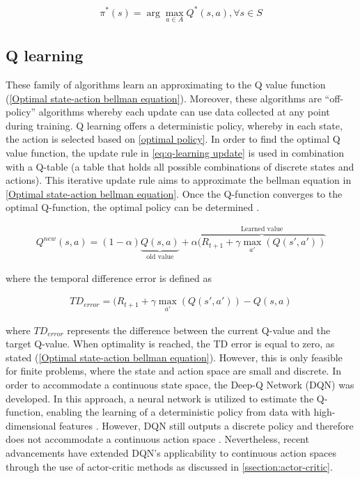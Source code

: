 \begin{equation}
	\begin{aligned}
		\pi^*(s) = \arg \max_{a \in A} Q^*(s, a), \forall s \in S
	\end{aligned}
	\label{optimal policy}
\end{equation}

\subsection{Q learning}
These family of algorithms learn an approximating to the Q value function (\autoref{Optimal state-action bellman equation}). Moreover, these algorithms are ``off-policy'' algorithms whereby each update can use data collected at any point during training. Q learning offers a deterministic policy, whereby in each state, the action is selected based on \autoref{optimal policy}. In order to find the optimal Q value function, the update rule in \autoref{eq:q-learning update} is used in combination with a Q-table (a table that holds all possible combinations of discrete states and actions). This iterative update rule aims to approximate the bellman equation in \autoref{Optimal state-action bellman equation}. Once the Q-function converges to the optimal Q-function, the optimal policy can be determined \cite{daveUnderstandingBellmanOptimality2021}.

\begin{equation}
	\begin{aligned}
		Q^{new}(s,a) = (1 -\alpha) \underbrace{Q(s,a)}_{\text{old value}} + \alpha \overbrace{(R_{t+1} + \gamma \max_{a'}(Q(s',a'))}^{\text{Learned value}}
	\end{aligned}
	\label{eq:q-learning update}
\end{equation}

where the temporal difference error is defined as

\begin{equation}
	\begin{aligned}
		TD_{error} = (R_{t+1} + \gamma \max_{a'}(Q(s',a')) - Q(s,a)
	\end{aligned}
	\label{eq:temporal difference}
\end{equation}

where $TD_{error}$ represents the difference between the current Q-value and the target Q-value. When optimality is reached, the TD error is equal to zero, as stated (\autoref{Optimal state-action bellman equation}). However, this is only feasible for finite problems, where the state and action space are small and discrete. In order to accommodate a continuous state space, the Deep-Q Network (DQN) was developed. In this approach, a neural network is utilized to estimate the Q-function, enabling the learning of a deterministic policy from data with high-dimensional features \cite{mnihPlayingAtariDeep2013}. However, DQN still outputs a discrete policy and therefore does not accommodate a continuous action space \cite{mnihPlayingAtariDeep2013}. Nevertheless, recent advancements have extended DQN's applicability to continuous action spaces through the use of actor-critic methods as discussed in \autoref{ssection:actor-critic}.

